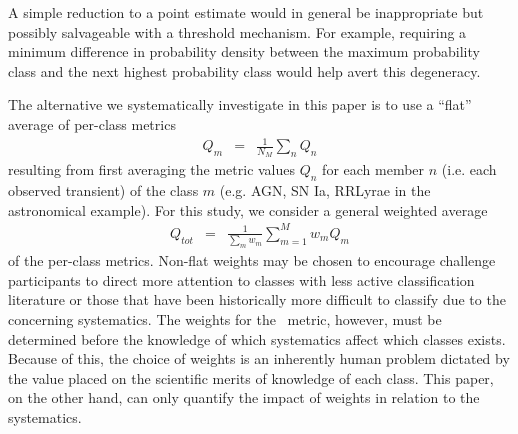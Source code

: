 A simple reduction to a point estimate would in general be inappropriate but possibly salvageable with a threshold mechanism.
For example, requiring a minimum difference in probability density between the maximum probability class and the next highest probability class would help avert this degeneracy.

The alternative we systematically investigate in this paper is to use a ``flat'' average of per-class metrics
\begin{eqnarray}
  \label{eq:perclassavg}
Q_{m} &=& \frac{1}{N_{M}}\sum_{n}Q_{n}
\end{eqnarray}
resulting from first averaging the metric values $Q_{n}$ for each member $n$ (i.e. each observed transient) of the class $m$ (e.g. AGN, SN Ia, RRLyrae in the astronomical example).
For this study, we consider a general weighted average
\begin{eqnarray}
  \label{eq:weightavg}
Q_{tot} &=& \frac{1}{\sum_{m}w_{m}}\sum_{m=1}^{M}w_{m}Q_{m}
\end{eqnarray}
of the per-class metrics.
Non-flat weights may be chosen to encourage challenge participants to direct more attention to classes with less active classification literature or those that have been historically more difficult to classify due to the concerning systematics.
The weights for the \plasticc\ metric, however, must be determined before the knowledge of which systematics affect which classes exists.
Because of this, the choice of weights is an inherently human problem dictated by the value placed on the scientific merits of knowledge of each class.
This paper, on the other hand, can only quantify the impact of weights in relation to the systematics.
